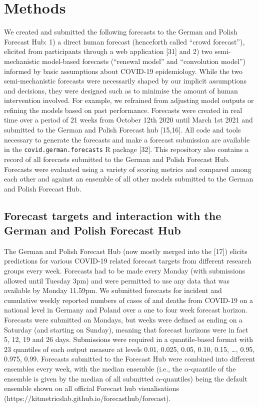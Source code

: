 \documentclass[10pt,letterpaper]{article}
\begin{document}
\hypertarget{methods}{%
\section{Methods}\label{methods}}

We created and submitted the following forecasts to the German and
Polish Forecast Hub: 1) a direct human forecast (henceforth called
``crowd forecast''), elicited from participants through a web
application {[}31{]} and 2) two semi-mechanistic model-based forecasts
(``renewal model'' and ``convolution model'') informed by basic
assumptions about COVID-19 epidemiology. While the two semi-mechanistic
forecasts were necessarily shaped by our implicit assumptions and
decisions, they were designed such as to minimise the amount of human
intervention involved. For example, we refrained from adjusting model
outputs or refining the models based on past performance. Forecasts were
created in real time over a period of 21 weeks from October 12th 2020
until March 1st 2021 and submitted to the German and Polish Forecast hub
{[}15,16{]}. All code and tools necessary to generate the forecasts and
make a forecast submission are available in the
\texttt{covid.german.forecasts} R package {[}32{]}. This repository also
contains a record of all forecasts submitted to the German and Polish
Forecast Hub. Forecasts were evaluated using a variety of scoring
metrics and compared among each other and against an ensemble of all
other models submitted to the German and Polish Forecast Hub.

\hypertarget{forecast-targets-and-interaction-with-the-german-and-polish-forecast-hub}{%
\subsection{Forecast targets and interaction with the German and Polish
Forecast
Hub}\label{forecast-targets-and-interaction-with-the-german-and-polish-forecast-hub}}

The German and Polish Forecast Hub (now mostly merged into the {[}17{]})
elicits predictions for various COVID-19 related forecast targets from
different research groups every week. Forecasts had to be made every
Monday (with submissions allowed until Tuesday 3pm) and were permitted
to use any data that was available by Monday 11.59pm. We submitted
forecasts for incident and cumulative weekly reported numbers of cases
of and deaths from COVID-19 on a national level in Germany and Poland
over a one to four week forecast horizon. Forecasts were submitted on
Mondays, but weeks were defined as ending on a Saturday (and starting on
Sunday), meaning that forecast horizons were in fact 5, 12, 19 and 26
days. Submissions were required in a quantile-based format with 23
quantiles of each output measure at levels 0.01, 0.025, 0.05, 0.10,
0.15, \ldots, 0.95, 0.975, 0.99. Forecasts submitted to the Forecast Hub
were combined into different ensembles every week, with the median
ensemble (i.e., the \(\alpha\)-quantile of the ensemble is given by the
median of all submitted \(\alpha\)-quantiles) being the default ensemble
shown on all official Forecast hub visualisations
(https://kitmetricslab.github.io/forecasthub/forecast).
\end{document}
